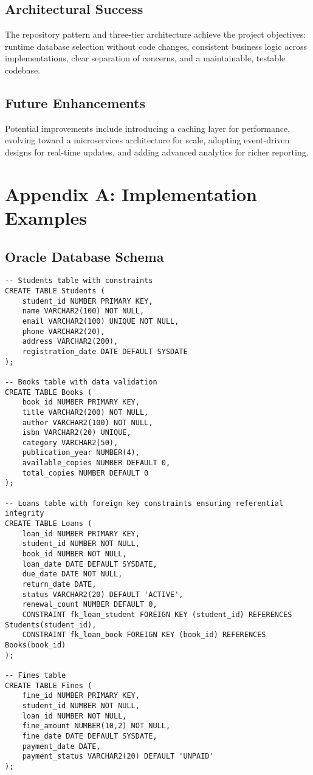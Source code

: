 \documentclass[12pt,a4paper]{article}
\begin{document}
\subsection{Architectural Success}

The repository pattern and three-tier architecture achieve the project objectives: runtime database selection without code changes, consistent business logic across implementations, clear separation of concerns, and a maintainable, testable codebase.

\subsection{Future Enhancements}

Potential improvements include introducing a caching layer for performance, evolving toward a microservices architecture for scale, adopting event-driven designs for real-time updates, and adding advanced analytics for richer reporting.

\appendix
\section{Appendix A: Implementation Examples}

\subsection{Oracle Database Schema}
\begin{lstlisting}[style=sql, caption=Oracle Database Schema]
-- Students table with constraints
CREATE TABLE Students (
    student_id NUMBER PRIMARY KEY,
    name VARCHAR2(100) NOT NULL,
    email VARCHAR2(100) UNIQUE NOT NULL,
    phone VARCHAR2(20),
    address VARCHAR2(200),
    registration_date DATE DEFAULT SYSDATE
);

-- Books table with data validation
CREATE TABLE Books (
    book_id NUMBER PRIMARY KEY,
    title VARCHAR2(200) NOT NULL,
    author VARCHAR2(100) NOT NULL,
    isbn VARCHAR2(20) UNIQUE,
    category VARCHAR2(50),
    publication_year NUMBER(4),
    available_copies NUMBER DEFAULT 0,
    total_copies NUMBER DEFAULT 0
);

-- Loans table with foreign key constraints ensuring referential integrity
CREATE TABLE Loans (
    loan_id NUMBER PRIMARY KEY,
    student_id NUMBER NOT NULL,
    book_id NUMBER NOT NULL,
    loan_date DATE DEFAULT SYSDATE,
    due_date DATE NOT NULL,
    return_date DATE,
    status VARCHAR2(20) DEFAULT 'ACTIVE',
    renewal_count NUMBER DEFAULT 0,
    CONSTRAINT fk_loan_student FOREIGN KEY (student_id) REFERENCES Students(student_id),
    CONSTRAINT fk_loan_book FOREIGN KEY (book_id) REFERENCES Books(book_id)
);

-- Fines table
CREATE TABLE Fines (
    fine_id NUMBER PRIMARY KEY,
    student_id NUMBER NOT NULL,
    loan_id NUMBER NOT NULL,
    fine_amount NUMBER(10,2) NOT NULL,
    fine_date DATE DEFAULT SYSDATE,
    payment_date DATE,
    payment_status VARCHAR2(20) DEFAULT 'UNPAID'
);
\end{lstlisting}
\end{document}

